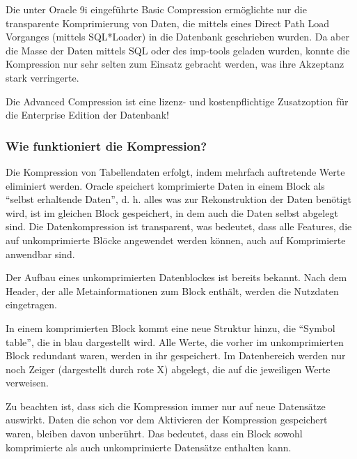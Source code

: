         Die unter Oracle 9i eingeführte Basic Compression ermöglichte nur die transparente Komprimierung von Daten, die mittels eines Direct Path Load Vorganges (mittels SQL*Loader) in die Datenbank geschrieben wurden. Da aber die Masse der Daten mittels SQL oder des imp-tools geladen wurden, konnte die Kompression nur sehr selten zum Einsatz gebracht werden, was ihre Akzeptanz stark verringerte.
        \begin{merke}
          Die Advanced Compression ist eine lizenz- und kostenpflichtige Zusatzoption für die Enterprise Edition der Datenbank!
        \end{merke}
        \subsubsection{Wie funktioniert die Kompression?}
          Die Kompression von Tabellendaten erfolgt, indem mehrfach auftretende Werte eliminiert werden. Oracle speichert komprimierte Daten in einem Block als \enquote{selbst erhaltende Daten}, d. h. alles was zur Rekonstruktion der Daten benötigt wird, ist im gleichen Block gespeichert, in dem auch die Daten selbst abgelegt sind. Die Datenkompression ist transparent, was bedeutet, dass alle Features, die auf unkomprimierte Blöcke angewendet werden können, auch auf Komprimierte anwendbar sind.

          Der Aufbau eines unkomprimierten Datenblockes ist bereits bekannt. Nach dem Header, der alle Metainformationen zum Block enthält, werden die Nutzdaten eingetragen.

          In einem komprimierten Block kommt eine neue Struktur hinzu, die \enquote{Symbol table}, die in  blau dargestellt wird. Alle Werte, die vorher im unkomprimierten Block redundant waren, werden in ihr gespeichert. Im Datenbereich werden nur noch Zeiger (dargestellt durch rote X) abgelegt, die auf die jeweiligen Werte verweisen.
          \begin{merke}
            Zu beachten ist, dass sich die Kompression immer nur auf neue Datensätze auswirkt. Daten die schon vor dem Aktivieren der Kompression gespeichert waren, bleiben davon unberührt. Das bedeutet, dass ein Block sowohl komprimierte als auch unkomprimierte Datensätze enthalten kann.
          \end{merke}
